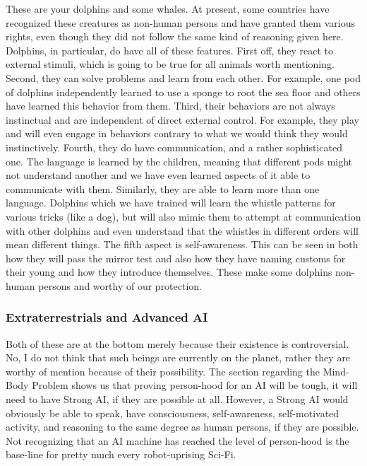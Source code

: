 These are your dolphins and some whales. At present, some countries have recognized these creatures as non-human persons and have granted them various rights, even though they did not follow the same kind of reasoning given here. Dolphins, in particular, do have all of these features. First off, they react to external stimuli, which is going to be true for all animals worth mentioning. Second, they can solve problems and learn from each other. For example, one pod of dolphins independently learned to use a sponge to root the sea floor and others have learned this behavior from them. Third, their behaviors are not always instinctual and are independent of direct external control. For example, they play and will even engage in behaviors contrary to what we would think they would instinctively. Fourth, they do have communication, and a rather sophisticated one. The language is learned by the children, meaning that different pods might not understand another and we have even learned aspects of it able to communicate with them. Similarly, they are able to learn more than one language. Dolphins which we have trained will learn the whistle patterns for various tricks (like a dog), but will also mimic them to attempt at communication with other dolphins and even understand that the whistles in different orders will mean different things. The fifth aspect is self-awareness. This can be seen in both how they will pass the mirror test and also how they have naming customs for their young and how they introduce themselves. These make some dolphins non-human persons and worthy of our protection.   
\subsubsection{Extraterrestrials and Advanced AI}

Both of these are at the bottom merely because their existence is controversial. No, I do not think that such beings are currently on the planet, rather they are worthy of mention because of their possibility. The section regarding the Mind-Body Problem shows us that proving person-hood for an AI will be tough, it will need to have Strong AI, if they are possible at all. However, a Strong AI would obviously be able to speak, have consciousness, self-awareness, self-motivated activity, and reasoning to the same degree as human persons, if they are possible. Not recognizing that an AI machine has reached the level of person-hood is the base-line for pretty much every robot-uprising Sci-Fi. 

